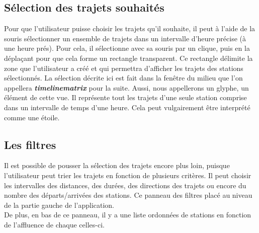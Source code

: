 \documentclass[12pt]{article}
\begin{document}
		\subsection{Sélection des trajets souhaités}
		Pour que l'utilisateur puisse choisir les trajets qu'il souhaite, il peut à l'aide de la
		souris sélectionner un ensemble de trajets dans un intervalle d'heure précise (à une
		heure prés). Pour cela, il sélectionne avec sa souris par un clique, puis en la 
		déplaçant pour que cela forme un rectangle transparent. Ce rectangle délimite la zone
		que l'utilisateur a créé et qui permettra d'afficher les trajets des stations
		sélectionnés. La sélection décrite ici est fait dans la fenêtre du milieu que l'on
		appellera \textbf{\textit{timelinematrix}} pour la suite. Aussi, nous appellerons
		un glyphe, un élément de cette vue. Il représente tout les trajets d'une seule station
		comprise dans un intervalle de temps d'une heure. Cela peut vulgairement être interprété
		comme une étoile.
		
		\subsection{Les filtres}
		Il est possible de pousser la sélection des trajets encore plus loin, puisque l'utilisateur
		peut trier les trajets en fonction de plusieurs critères. Il peut choisir les intervalles
		des distances, des durées, des directions des trajets ou encore du nombre des
		départs/arrivées des stations. Ce panneau des filtres placé au niveau de la partie gauche
		de l'application.\\
		De plus, en bas de ce panneau, il y a une liste ordonnées de stations en fonction
		de l'affluence de chaque celles-ci.
	
\newpage
\end{document}
